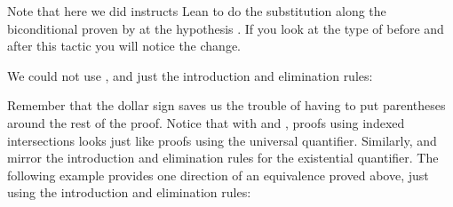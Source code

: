 \documentclass[letterpaper,10pt,english]{sphinxmanual}
\begin{document}
\sphinxAtStartPar
Note that here we did  instructs Lean
to do the substitution along the biconditional proven by  at
the hypothesis .
If you look at the type of  before and after this tactic
you will notice the change.

\sphinxAtStartPar
We could not use ,
and just the introduction and elimination rules:

\begin{sphinxVerbatim}[commandchars=\\\{\}]
           
 
  
      

                    
  

                    
  

                 
  
  
       
   
\end{sphinxVerbatim}

\sphinxAtStartPar
Remember that the dollar sign saves us the trouble of having to put parentheses around the rest of the proof. Notice that with  and , proofs using indexed intersections looks just like proofs using the universal quantifier. Similarly,  and  mirror the introduction and elimination rules for the existential quantifier.
The following example provides one direction of an equivalence proved above,
just using the introduction and elimination rules:
\end{document}
